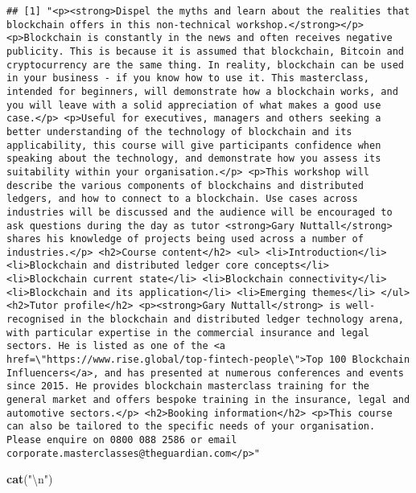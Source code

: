 \documentclass[]{article}
\newenvironment{Shaded}{\begin{snugshade}}{\end{snugshade}}
\newcommand{\KeywordTok}[1]{\textcolor[rgb]{0.13,0.29,0.53}{\textbf{#1}}}
\newcommand{\CharTok}[1]{\textcolor[rgb]{0.31,0.60,0.02}{#1}}
\newcommand{\StringTok}[1]{\textcolor[rgb]{0.31,0.60,0.02}{#1}}
\newcommand{\NormalTok}[1]{#1}
\begin{document}
\begin{verbatim}
## [1] "<p><strong>Dispel the myths and learn about the realities that blockchain offers in this non-technical workshop.</strong></p> <p>Blockchain is constantly in the news and often receives negative publicity. This is because it is assumed that blockchain, Bitcoin and cryptocurrency are the same thing. In reality, blockchain can be used in your business - if you know how to use it. This masterclass, intended for beginners, will demonstrate how a blockchain works, and you will leave with a solid appreciation of what makes a good use case.</p> <p>Useful for executives, managers and others seeking a better understanding of the technology of blockchain and its applicability, this course will give participants confidence when speaking about the technology, and demonstrate how you assess its suitability within your organisation.</p> <p>This workshop will describe the various components of blockchains and distributed ledgers, and how to connect to a blockchain. Use cases across industries will be discussed and the audience will be encouraged to ask questions during the day as tutor <strong>Gary Nuttall</strong> shares his knowledge of projects being used across a number of industries.</p> <h2>Course content</h2> <ul> <li>Introduction</li> <li>Blockchain and distributed ledger core concepts</li> <li>Blockchain current state</li> <li>Blockchain connectivity</li> <li>Blockchain and its application</li> <li>Emerging themes</li> </ul> <h2>Tutor profile</h2> <p><strong>Gary Nuttall</strong> is well-recognised in the blockchain and distributed ledger technology arena, with particular expertise in the commercial insurance and legal sectors. He is listed as one of the <a href=\"https://www.rise.global/top-fintech-people\">Top 100 Blockchain Influencers</a>, and has presented at numerous conferences and events since 2015. He provides blockchain masterclass training for the general market and offers bespoke training in the insurance, legal and automotive sectors.</p> <h2>Booking information</h2> <p>This course can also be tailored to the specific needs of your organisation. Please enquire on 0800 088 2586 or email corporate.masterclasses@theguardian.com</p>"
\end{verbatim}

\begin{Shaded}
\begin{Highlighting}[]
\KeywordTok{cat}\NormalTok{(}\StringTok{"}\CharTok{\textbackslash{}n}\StringTok{"}\NormalTok{)}
\end{Highlighting}
\end{Shaded}
\end{document}

